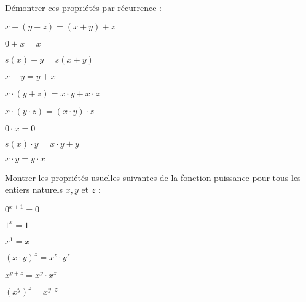 \documentclass[french]{report}
\begin{document}
\begin{exo}
    Démontrer ces propriétés par récurrence :
    \begin{q}{1}
        \(x+(y+z)=(x+y)+z\)
    \end{q}
    \begin{q}{2}
        \(0+x=x\)
    \end{q}
    \begin{q}{3}
        \(s(x)+y=s(x+y)\)
    \end{q}
    \begin{q}{4}
        \(x+y=y+x\)
    \end{q}
    \begin{q}{5}
        \(x\cdot(y+z)=x\cdot y+x\cdot z\)
    \end{q}
    \begin{q}{6}
        \(x\cdot(y\cdot z)=(x\cdot y)\cdot z\)
    \end{q}
    \begin{q}{7}
        \(0\cdot x=0\)
    \end{q}
    \begin{q}{8}
        \(s(x)\cdot y=x\cdot y+y\)
    \end{q}
    \begin{q}{9}
        \(x\cdot y=y\cdot x\)
    \end{q}
\end{exo}

\begin{exo}
    Montrer les propriétés usuelles suivantes de la fonction puissance pour tous les
    entiers naturels \(x,y\) et \(z\) :
    \begin{q}{1}
        \(0^{x+1}=0\)
    \end{q}
    \begin{q}{2}
        \(1^x=1\)
    \end{q}
    \begin{q}{3}
        \(x^1=x\)
    \end{q}
    \begin{q}{4}
        \(\left(x\cdot y\right)^z=x^z\cdot y^z\)
    \end{q}
    \begin{q}{5}
        \(x^{y+z}=x^y\cdot x^z\)
    \end{q}
    \begin{q}{6}
        \(\left(x^y\right)^z=x^{y\cdot z}\)
    \end{q}
\end{exo}
\end{document}

